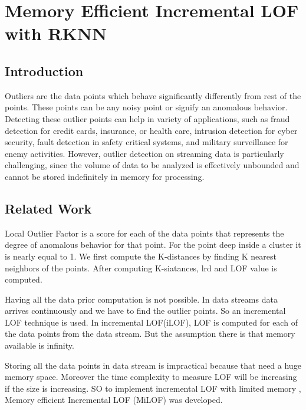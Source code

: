 \chapter{Memory Efficient Incremental LOF with RKNN}\label{Memory Efficient Incremental LOF with RKNN}

\section{Introduction}

Outliers are the data points which behave significantly differently from rest of the points. These points can be any noisy point or signify an anomalous behavior. Detecting these outlier points can help in variety of applications, such as fraud detection for credit cards, insurance, or health care, intrusion detection
for cyber security, fault detection in safety critical systems, and military surveillance
for enemy activities. However, outlier detection on streaming data is particularly
challenging, since the volume of data to be analyzed is
effectively unbounded and cannot be stored indefinitely in
memory for processing.

\section{Related Work}

Local Outlier Factor is a score for each of the data points that represents the degree of anomalous behavior for that point. For the point deep inside a cluster it is nearly equal to 1. We first compute the K-distances by finding K nearest neighbors of the points. After computing K-siatances, lrd and LOF value is computed.

\par
Having all the data prior computation is not possible. In data streams data arrives continuously and we have to find the outlier points. So an incremental LOF technique is used. In incremental LOF(iLOF), LOF is computed for each of the data points from the data stream. But the assumption there is that memory available is infinity. 

\par

Storing all the data points in data stream is impractical because that need a huge memory space. Moreover the time complexity to measure LOF will be increasing if the size is increasing. SO to implement incremental LOF with limited memory , Memory efficient Incremental LOF (MiLOF) was developed. 


